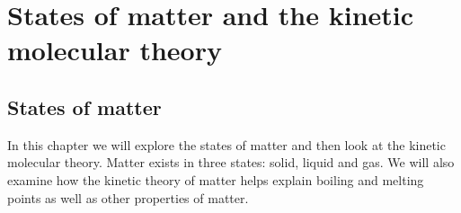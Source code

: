          \chapter{States of matter and the kinetic molecular theory}
    \setcounter{figure}{1}
    \setcounter{subfigure}{1}
\label{m38736*cid2}
            \section{States of matter}
            \nopagebreak

\label{m38736*id802341}In this chapter we will explore the states of matter and then look at the kinetic molecular theory. Matter exists in three states: solid, liquid and gas. We will also examine how the kinetic theory of matter helps explain boiling and melting points as well as other properties of matter.\par 

